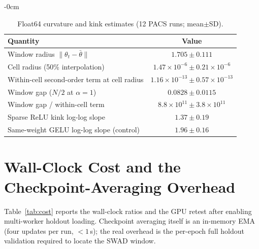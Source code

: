 \documentclass[electronics,article,submit,moreauthors]{Definitions/mdpi}
\begin{document}
\begin{adjustwidth}{-\extralength}{0cm}
\begin{table}[H]
\centering
\caption{Float64 curvature and kink estimates (12 PACS runs; mean$\pm$SD).}
\label{tab:kappaf64}
\setlength{\tabcolsep}{5pt}
\footnotesize
\begin{tabular}{lc}
\toprule
\textbf{Quantity} & \textbf{Value}\\
\midrule
Window radius $\|\theta_t-\bar\theta\|$ & $1.705\pm0.111$\\
Cell radius (50\% interpolation) & $1.47\times10^{-6}\pm0.21\times10^{-6}$\\
Within-cell second-order term at cell radius & $1.16\times10^{-13}\pm0.57\times10^{-13}$\\
Window gap ($N/2$ at $\alpha=1$) & $0.0828\pm0.0115$\\
Window gap / within-cell term & $8.8\times10^{11}\pm3.8\times10^{11}$\\
Sparse ReLU kink log-log slope & $1.37\pm0.19$\\
Same-weight GELU log-log slope (control) & $1.96\pm0.16$\\
\bottomrule
\end{tabular}
\end{table}

\section{Wall-Clock Cost and the Checkpoint-Averaging Overhead}
\label{sec:appcost}

Table~\ref{tab:cost} reports the wall-clock ratios and the GPU retest after enabling multi-worker holdout loading. Checkpoint averaging itself is an in-memory EMA (four updates per run, $<1$\,s); the real overhead is the per-epoch full holdout validation required to locate the SWAD window.


\end{adjustwidth}
\end{document}

